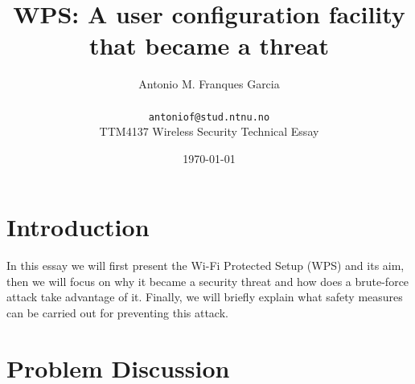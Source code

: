 \documentclass[a4paper,11pt]{article}
\title{WPS: A user configuration facility that became a threat}
\author{Antonio M. Franques Garcia \\\\
	\texttt{antoniof@stud.ntnu.no}\\
	TTM4137 Wireless Security Technical Essay}
\date{\today}
\begin{document}
\maketitle

\section{Introduction}
In this essay we will first present the Wi-Fi Protected Setup (WPS) and its aim, then we will focus on why it became a security threat and how does a brute-force attack take advantage of it. Finally, we will briefly explain what safety measures can be carried out for preventing this attack.

\section{Problem Discussion}
\end{document}
